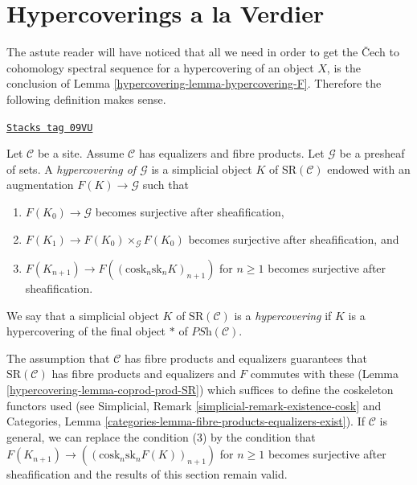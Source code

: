 \section{Hypercoverings a la Verdier}
\label{hypercovering-section-hypercoverings-verdier}
The astute reader will have noticed that all we need in order
to get the {\v C}ech to cohomology spectral sequence for a
hypercovering of an object $X$, is the
conclusion of Lemma \ref{hypercovering-lemma-hypercovering-F}.
Therefore the following definition makes sense.

\begin{definition}
\label{hypercovering-definition-hypercovering-variant}
\href{https://stacks.math.columbia.edu/tag/09VU}{\texttt{Stacks tag 09VU}}

Let $\mathcal{C}$ be a site. Assume $\mathcal{C}$ has equalizers
and fibre products. Let $\mathcal{G}$ be a presheaf of sets.
A {\it hypercovering of $\mathcal{G}$} is a simplicial object
$K$ of $\text{SR}(\mathcal{C})$ endowed with an augmentation
$F(K) \to \mathcal{G}$ such that
\begin{enumerate}
\item $F(K_0) \to \mathcal{G}$ becomes surjective
after sheafification,
\item $F(K_1) \to F(K_0) \times_\mathcal{G} F(K_0)$
becomes surjective after sheafification, and
\item $F(K_{n + 1}) \longrightarrow F((\text{cosk}_n \text{sk}_n K)_{n + 1})$
for $n \geq 1$ becomes surjective after sheafification.
\end{enumerate}
We say that a simplicial object $K$ of $\text{SR}(\mathcal{C})$
is a {\it hypercovering} if $K$ is a hypercovering of the final
object $*$ of $\textit{PSh}(\mathcal{C})$.
\end{definition}

The assumption that $\mathcal{C}$ has fibre products and equalizers
guarantees that $\text{SR}(\mathcal{C})$ has fibre products
and equalizers and $F$ commutes with these
(Lemma \ref{hypercovering-lemma-coprod-prod-SR}) which suffices
to define the coskeleton functors used (see
Simplicial, Remark \ref{simplicial-remark-existence-cosk} and
Categories, Lemma \ref{categories-lemma-fibre-products-equalizers-exist}).
If $\mathcal{C}$ is general, we can replace the condition (3) by the
condition that
$F(K_{n + 1}) \longrightarrow ((\text{cosk}_n \text{sk}_n F(K))_{n + 1})$
for $n \geq 1$ becomes surjective after sheafification and the
results of this section remain valid.

